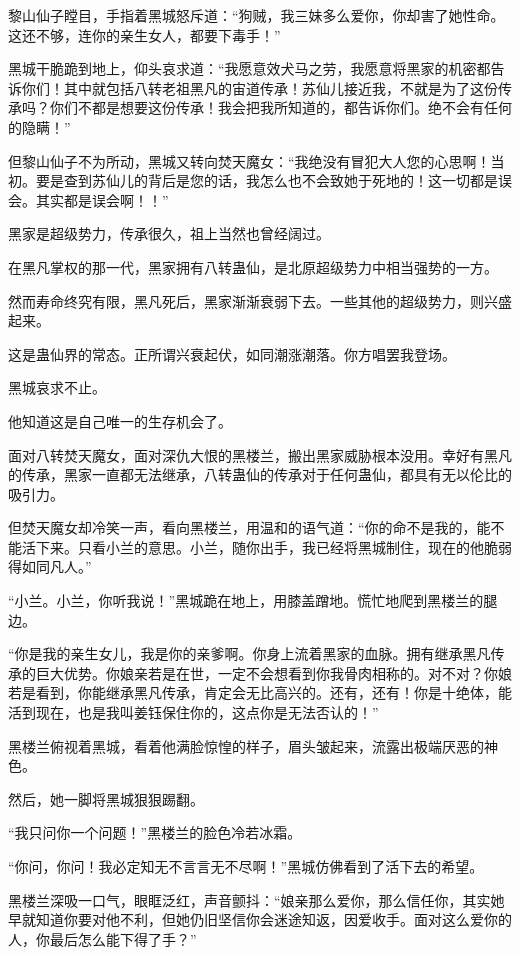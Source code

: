 \begin{this_body}
黎山仙子瞠目，手指着黑城怒斥道：“狗贼，我三妹多么爱你，你却害了她性命。这还不够，连你的亲生女人，都要下毒手！”

黑城干脆跪到地上，仰头哀求道：“我愿意效犬马之劳，我愿意将黑家的机密都告诉你们！其中就包括八转老祖黑凡的宙道传承！苏仙儿接近我，不就是为了这份传承吗？你们不都是想要这份传承！我会把我所知道的，都告诉你们。绝不会有任何的隐瞒！”

但黎山仙子不为所动，黑城又转向焚天魔女：“我绝没有冒犯大人您的心思啊！当初。要是查到苏仙儿的背后是您的话，我怎么也不会致她于死地的！这一切都是误会。其实都是误会啊！！”

黑家是超级势力，传承很久，祖上当然也曾经阔过。

在黑凡掌权的那一代，黑家拥有八转蛊仙，是北原超级势力中相当强势的一方。

然而寿命终究有限，黑凡死后，黑家渐渐衰弱下去。一些其他的超级势力，则兴盛起来。

这是蛊仙界的常态。正所谓兴衰起伏，如同潮涨潮落。你方唱罢我登场。

黑城哀求不止。

他知道这是自己唯一的生存机会了。

面对八转焚天魔女，面对深仇大恨的黑楼兰，搬出黑家威胁根本没用。幸好有黑凡的传承，黑家一直都无法继承，八转蛊仙的传承对于任何蛊仙，都具有无以伦比的吸引力。

但焚天魔女却冷笑一声，看向黑楼兰，用温和的语气道：“你的命不是我的，能不能活下来。只看小兰的意思。小兰，随你出手，我已经将黑城制住，现在的他脆弱得如同凡人。”

“小兰。小兰，你听我说！”黑城跪在地上，用膝盖蹭地。慌忙地爬到黑楼兰的腿边。

“你是我的亲生女儿，我是你的亲爹啊。你身上流着黑家的血脉。拥有继承黑凡传承的巨大优势。你娘亲若是在世，一定不会想看到你我骨肉相称的。对不对？你娘若是看到，你能继承黑凡传承，肯定会无比高兴的。还有，还有！你是十绝体，能活到现在，也是我叫姜钰保住你的，这点你是无法否认的！”

黑楼兰俯视着黑城，看着他满脸惊惶的样子，眉头皱起来，流露出极端厌恶的神色。

然后，她一脚将黑城狠狠踢翻。

“我只问你一个问题！”黑楼兰的脸色冷若冰霜。

“你问，你问！我必定知无不言言无不尽啊！”黑城仿佛看到了活下去的希望。

黑楼兰深吸一口气，眼眶泛红，声音颤抖：“娘亲那么爱你，那么信任你，其实她早就知道你要对他不利，但她仍旧坚信你会迷途知返，因爱收手。面对这么爱你的人，你最后怎么能下得了手？”


\end{this_body}
